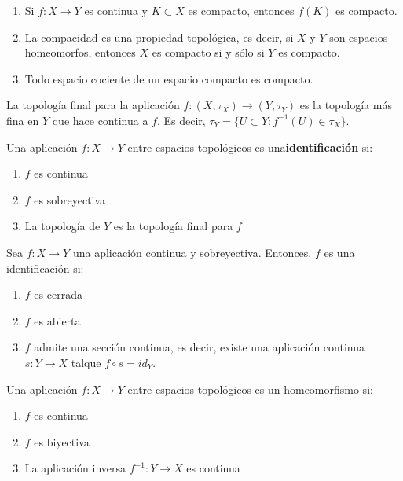 \begin{corolario}
    \vspace{-1 cm} 
    \begin{enumerate}
        \item Si $f: X \to Y$ es continua y $K \subset X$ es compacto, entonces $f(K)$ es compacto.
        \item La compacidad es una propiedad topológica, es decir, si $X$ y $Y$ son espacios homeomorfos, entonces $X$ es compacto si y sólo si $Y$ es compacto.
        \item Todo espacio cociente de un espacio compacto es compacto.
    \end{enumerate}
\end{corolario}
\begin{definición}
    La topología final para la aplicación $f: (X, \tau_X) \to (Y, \tau_Y)$ es la topología más fina en $Y$ que hace continua a $f$. Es decir, $\tau_Y = \{U \subset Y : f^{-1}(U) \in \tau_X\}$.
\end{definición}
\begin{definición}[Identificación]
    Una aplicación $f: X \to Y$ entre espacios topológicos es una\textbf{identificación} si:
    \begin{enumerate}
        \item $f$ es continua
        \item $f$ es sobreyectiva
        \item La topología de $Y$ es la topología final para $f$
    \end{enumerate}
\end{definición}
\begin{proposición}
    Sea $f:X \to Y$ una aplicación continua y sobreyectiva. Entonces, $f$ es una identificación si:
    \begin{enumerate}
        \item $f$ es cerrada
        \item $f$ es abierta
        \item $f$ admite una sección continua, es decir, existe una aplicación continua $s:Y \to X$ talque $f \circ s = id_Y$.
    \end{enumerate}
\end{proposición}
\begin{definición}[Homeomorfismo]
    Una aplicación $f: X \to Y$ entre espacios topológicos es un homeomorfismo si:
    \begin{enumerate}
        \item $f$ es continua
        \item $f$ es biyectiva
        \item La aplicación inversa $f^{-1}: Y \to X$ es continua
    \end{enumerate}
\end{definición}
